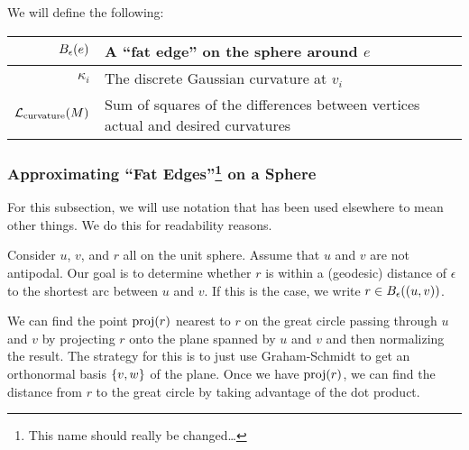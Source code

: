 
We will define the following: \begin{center}\begin{tabular}{r|l}
	\(B_{\epsilon}\pof{e}\) & A ``fat edge'' on the sphere around \(e\) \\ \hline
	\(\kappa_i\) & The discrete Gaussian curvature at \(v_i\) \\ \hline
	\(\mathcal{L}_{\mathrm{curvature}}\pof{M}\) & Sum of squares of the differences between vertices actual and desired curvatures
\end{tabular}\end{center}

\subsubsection[Approximating "Fat Edges" on a Sphere]{Approximating ``Fat Edges''\footnote{This name should really be changed\dots}  on a Sphere}
For this subsection, we will use notation that has been used elsewhere to mean other things. We do this for readability reasons.

Consider \(u\), \(v\), and \(r\) all on the unit sphere. Assume that \(u\) and \(v\) are not antipodal. Our goal is to determine whether \(r\) is within a (geodesic) distance of \(\epsilon\) to the shortest arc between \(u\) and \(v\). If this is the case, we write \(r \in B_\epsilon\pof{\pof{u, v}}\).

We can find the point \(\proj\pof{r}\) nearest to \(r\) on the great circle passing through \(u\) and \(v\) by projecting \(r\) onto the plane spanned by \(u\) and \(v\) and then normalizing the result. The strategy for this is to just use Graham-Schmidt to get an orthonormal basis \(\cof{v, w}\) of the plane. Once we have \(\proj\pof{r}\), we can find the distance from \(r\) to the great circle by taking advantage of the dot product.


